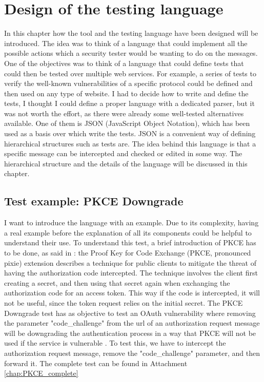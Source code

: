 \chapter{Design of the testing language}
In this chapter how the tool and the testing language have been designed will be introduced. The idea was to think of a language that could implement all the possible actions which a security tester would be wanting to do on the messages. One of the objectives was to think of a language that could define tests that could then be tested over multiple web services. For example, a series of tests to verify the well-known vulnerabilities of a specific protocol could be defined and then used on any type of website.
I had to decide how to write and define the tests, I thought I could define a proper language with a dedicated parser, but it was not worth the effort, as there were already some well-tested alternatives available. One of them is JSON (JavaScript Object Notation), which has been used as a basis over which write the tests. JSON is a convenient way of defining hierarchical structures such as tests are.
The idea behind this language is that a specific message can be intercepted and checked or edited in some way.
The hierarchical structure and the details of the language will be discussed in this chapter.

\section{Test example: PKCE Downgrade}
I want to introduce the language with an example. Due to its complexity, having a real example before the explanation of all its components could be helpful to understand their use.
To understand this test, a brief introduction of PKCE has to be done, as said in \cite{pkce_explanation}: the Proof Key for Code Exchange (PKCE, pronounced pixie) extension describes a technique for public clients to mitigate the threat of having the authorization code intercepted. The technique involves the client first creating a secret, and then using that secret again when exchanging the authorization code for an access token. This way if the code is intercepted, it will not be useful, since the token request relies on the initial secret. 
The PKCE Downgrade test has as objective to test an \Gls{OAuth} vulnerability where removing the parameter "code\_challenge" from the url of an authorization request message will be downgrading the authentication process in a way that PKCE will not be used if the service is vulnerable \cite{pkce_downgrade}. To test this, we have to intercept the authorization request message, remove the "code\_challenge" parameter, and then forward it.
The complete test can be found in Attachment \ref{chap:PKCE_complete}


